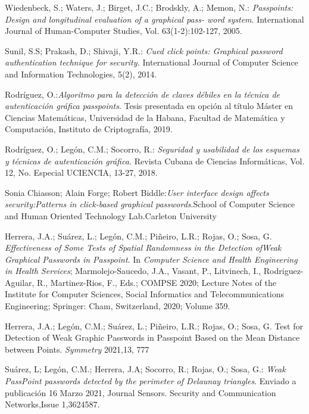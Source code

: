 \documentclass[12pt]{report}
\begin{document}

\begin{thebibliography}{9}
	\normalsize{
		 Wiedenbeck, S.; Waters, J.; Birget, J.C.; Brodskly, A.; Memon, N.:\textit{ Passpoints: Design and
		longitudinal evaluation of a graphical pass- word system}. International Journal of Human-Computer
		Studies, Vol. 63(1-2):102-127, 2005.
	
		 Sunil, S.S; Prakash, D.; Shivaji, Y.R.:\textit{ Cued click points: Graphical password authentication technique
		for security.} International Journal of Computer Science and Information Technologies, 5(2), 2014.
	
		 Rodríguez, O.:\textit{Algoritmo para la detección de claves débiles en la técnica de autenticación gráfica passpoints}. Tesis presentada en opción al título Máster en Ciencias Matemáticas, Universidad de la
		Habana, Facultad de Matemática y Computación, Instituto de Criptografía, 2019.
	
		 Rodríguez, O.; Legón, C.M.; Socorro, R.: \textit{Seguridad y usabilidad de los esquemas y técnicas de autenticación gráfica.} Revista Cubana de Ciencias Informáticas, Vol. 12, No. Especial UCIENCIA,
		13-27, 2018.
		
		 Sonia Chiasson; Alain Forge; Robert Biddle:\textit{User interface design affects security:Patterns in
		click-based graphical passwords}.School of Computer Science and Human Oriented Technology
		Lab.Carleton University
		
		Herrera, J.A.; Suárez, L.; Legón, C.M.; Piñeiro, L.R.; Rojas, O.; Sosa, G.\textit{ Effectiveness of Some Tests of Spatial Randomness in the Detection ofWeak Graphical Passwords in Passpoint}. In \textit{Computer Science and Health Engineering in Health Services}; Marmolejo-Saucedo, J.A., Vasant, P., Litvinech, I., Rodriguez-Aguilar, R., Martinez-Rios, F., Eds.; COMPSE 2020; Lecture Notes of the Institute for Computer Sciences, Social Informatics and Telecommunications Engineering; Springer: Cham, Switzerland, 2020; Volume 359.
		
		Herrera, J.A.; Legón, C.M.; Suárez, L.; Piñeiro, L.R.; Rojas, O.; Sosa, G. Test for Detection of Weak Graphic Passwords in Passpoint Based on the Mean Distance between Points.\textit{ Symmetry} 2021,13, 777
		
		Suárez, L; Legón, C.M.; Herrera, J.A; Socorro, R.; Rojas, O.; Sosa,
		G.: \textit{Weak PassPoint passwords detected by the perimeter of Delaunay triangles}. Enviado a publicación 16 Marzo 2021, Journal Sensors. Security and Communication Networks,Issue 1,3624587.
		
}
\end{thebibliography}
\end{document}
